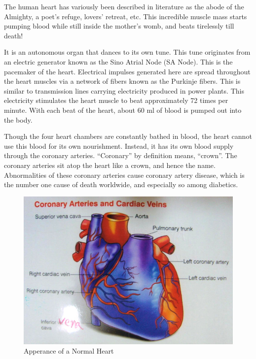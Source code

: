 {

The human heart has variously been described in literature as the abode of the Almighty, a poet’s refuge, lovers’ retreat, etc. This incredible muscle mass starts pumping blood while still inside the mother’s womb, and beats tirelessly till death!

It is an autonomous organ that dances to its own tune. This tune originates from an electric generator known as the Sino Atrial Node (SA Node). This is the pacemaker of the heart. Electrical impulses generated here are spread throughout the heart muscles via a network of fibers known as the Purkinje fibers. This is similar to transmission lines carrying electricity produced in power plants. This electricity stimulates the heart muscle to beat approximately 72 times per minute. With each beat of the heart, about 60 ml of blood is pumped out into the body.

Though the four heart chambers are constantly bathed in blood, the heart cannot use this blood for its own nourishment. Instead, it has its own blood supply through the coronary arteries. “Coronary” by definition means, “crown”. The coronary arteries sit atop the heart like a crown, and hence the name. Abnormalities of these coronary arteries cause coronary artery disease, which is the number one cause of death worldwide, and especially so among diabetics.

\begin{figure}
\includegraphics{images/039.jpg}
\caption{Apperance of a Normal Heart}
\end{figure}


}
